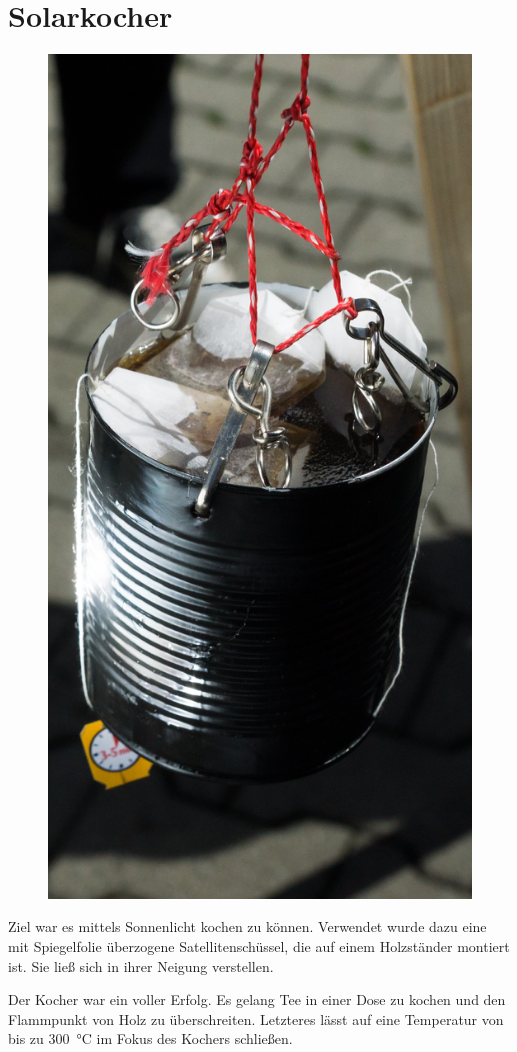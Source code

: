 \documentclass[
  captions=tableheading,  %
  titlepage=false, %
  twocolumn,
  headings=small,
]{scrartcl}
\begin{document}
\section*{Solarkocher}
\begin{figure}
  \centering
  \includegraphics[width=\linewidth]{./images/solarkocher_tee.JPG}
\end{figure}
Ziel war es mittels Sonnenlicht kochen zu können.
Verwendet wurde dazu eine mit Spiegelfolie überzogene Satellitenschüssel, die auf einem Holzständer montiert ist.
Sie ließ sich in ihrer Neigung verstellen.

Der Kocher war ein voller Erfolg.
Es gelang Tee in einer Dose zu kochen und den Flammpunkt von Holz zu überschreiten.
Letzteres lässt auf eine Temperatur von bis zu \SI{300}{\celsius} im Fokus des Kochers schließen.
\end{document}
